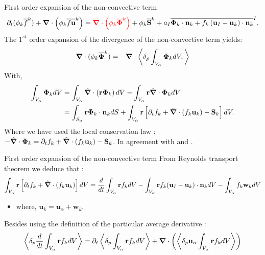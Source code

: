 \documentclass{sintefbeamer}
\newcommand{\nablab}{\bm{\nabla}}
\newcommand{\nablabh}{\hat{\bm{\nabla}}}
\begin{document}
\begin{frame}  {First order expansion of the non-convective term}
  \begin{equation*}
    \pddt (\phi_k\kavg{f})
    +\nablab \cdot \left(
        \phi_k \kavg{f \textbf{u}}
    \right)
    = \textcolor{red}{\nablab \cdot \left(
        \phi_k \kavg{\bm{\Phi}}
    \right)}
    + \phi_k \kavg{\textbf{S}}
    + a_I \Iavg{
        \bm{\Phi}_k \cdot \textbf{n}_k
        + f_k 
        \left(
            \textbf{u}_I
            - \textbf{u}_k
        \right) \cdot \textbf{n}_k
    },
\end{equation*}
  The $1^{st}$ order expansion of the divergence of the non-convective term yields:
  \begin{equation*}
    \nablab\cdot
    (\phi_k \kavg{\bm{\Phi}})=
        - \nablab \cdot
        \pavg{
          \int_{V_\alpha}
          \bm{\Phi}_k dV,
        }
\end{equation*}
With,
\begin{align*}
    \int_{V_\alpha} \bm{\Phi}_k  dV
    &= \int_{V_\alpha}  \nablabh \cdot \left(\textbf{r} \bm{\Phi}_k\right) dV
    - \int_{V_\alpha} \textbf{r} \nablabh \cdot \mathbf{\Phi}_k dV\\
    &=\int_{S_\alpha} \textbf{r} \bm{\Phi}_k \cdot \textbf{n}_k dS
    + \int_{V_\alpha} \textbf{r} \left[
        \pddt f_k 
        + \nablabh \cdot (f_k \textbf{u}_k)
        - \textbf{S}_k
    \right] dV.\\
\end{align*}
Where we have used the local conservation law :
 $-\nablabh \cdot \bm{\Phi}_k
  = \pddt f_k  + \nablabh \cdot (f_k \textbf{u}_k)
  - \textbf{S}_k$. 
  In agreement with \citet{nott2011suspension} and \citet{prosperetti2004average}.
\end{frame}

\begin{frame}
  {First order expansion of the non-convective term}
From Reynolds transport theorem we deduce that :
\begin{equation*}
  \int_{V_\alpha} \textbf{r} \left[\pddt f_k + \nablabh \cdot (f_k \textbf{u}_k)\right]dV
  = \ddt \int_{V_\alpha} \textbf{r} f_k dV 
  - \int_{V_\alpha} \textbf{r} f_k (\textbf{u}_I   - \textbf{u}_k) \cdot \textbf{n}_k dV
  - \int_{V_\alpha} f_k \textbf{w}_k dV
\end{equation*}
\begin{itemize}
  \item where, $\textbf{u}_k = \textbf{u}_\alpha + \textbf{w}_k$.
\end{itemize}
Besides using the definition of the particular average derivative : 
\begin{equation*}
  \pavg{\ddt \int_{V_\alpha} \textbf{r} f_k dV}
  = \pddt \pavg{\int_{V_\alpha} \textbf{r} f_k dV}
  + \nablab\cdot\left(\pavg{\textbf{u}_\alpha \int_{V_\alpha} \textbf{r} f_k dV}\right)
\end{equation*}
\end{frame}
\end{document}
